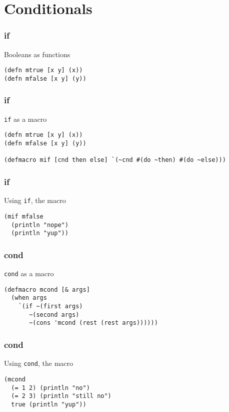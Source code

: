\documentclass[aspectratio=169]{beamer}
\begin{document}
  \section{Conditionals}
  \begin{frame}[fragile]
    \frametitle{if}
    \begin{listing}[H]
      \caption{Booleans as functions}
      \begin{verbatim}
(defn mtrue [x y] (x))
(defn mfalse [x y] (y))
      \end{verbatim}
    \end{listing}
  \end{frame}
  \begin{frame}[fragile]
    \frametitle{if}
    \begin{listing}[H]
      \caption{\texttt{if} as a macro}
      \begin{verbatim}
(defn mtrue [x y] (x))
(defn mfalse [x y] (y))

(defmacro mif [cnd then else] `(~cnd #(do ~then) #(do ~else)))
      \end{verbatim}
    \end{listing}
  \end{frame}
  \begin{frame}[fragile]
    \frametitle{if}
    \begin{listing}[H]
      \caption{Using \texttt{if}, the macro}
      \begin{verbatim}
(mif mfalse
  (println "nope")
  (println "yup"))
      \end{verbatim}
    \end{listing}
  \end{frame}
  \begin{frame}[fragile]
    \frametitle{cond}
    \begin{listing}[H]
      \caption{\texttt{cond} as a macro}
      \begin{verbatim}
(defmacro mcond [& args]
  (when args
    `(if ~(first args)
       ~(second args)
       ~(cons 'mcond (rest (rest args))))))
      \end{verbatim}
    \end{listing}
  \end{frame}
  \begin{frame}[fragile]
    \frametitle{cond}
    \begin{listing}[H]
      \caption{Using \texttt{cond}, the macro}
      \begin{verbatim}
(mcond
  (= 1 2) (println "no")
  (= 2 3) (println "still no")
  true (println "yup"))
      \end{verbatim}
    \end{listing}
  \end{frame}
\end{document}

